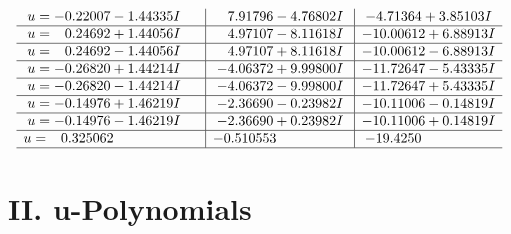 \documentclass[1p]{elsarticle_modified}
\theoremstyle{definition}
\begin{document}
$$\begin{array}{c|c|c}
\begin{aligned}
u &= -0.22007 - 1.44335 I\end{aligned}
 & \phantom{-}7.91796 - 4.76802 I & -4.71364 + 3.85103 I \\ \hline\begin{aligned}
u &= \phantom{-}0.24692 + 1.44056 I\end{aligned}
 & \phantom{-}4.97107 - 8.11618 I & -10.00612 + 6.88913 I \\ \hline\begin{aligned}
u &= \phantom{-}0.24692 - 1.44056 I\end{aligned}
 & \phantom{-}4.97107 + 8.11618 I & -10.00612 - 6.88913 I \\ \hline\begin{aligned}
u &= -0.26820 + 1.44214 I\end{aligned}
 & -4.06372 + 9.99800 I & -11.72647 - 5.43335 I \\ \hline\begin{aligned}
u &= -0.26820 - 1.44214 I\end{aligned}
 & -4.06372 - 9.99800 I & -11.72647 + 5.43335 I \\ \hline\begin{aligned}
u &= -0.14976 + 1.46219 I\end{aligned}
 & -2.36690 - 0.23982 I & -10.11006 - 0.14819 I \\ \hline\begin{aligned}
u &= -0.14976 - 1.46219 I\end{aligned}
 & -2.36690 + 0.23982 I & -10.11006 + 0.14819 I \\ \hline\begin{aligned}
u &= \phantom{-}0.325062\phantom{ +0.000000I}\end{aligned}
 & -0.510553\phantom{ +0.000000I} & -19.4250\phantom{ +0.000000I}\\
 \hline 
 \end{array}$$\newpage
\newpage\renewcommand{\arraystretch}{1}
\centering \section*{ II. u-Polynomials}
\end{document}
